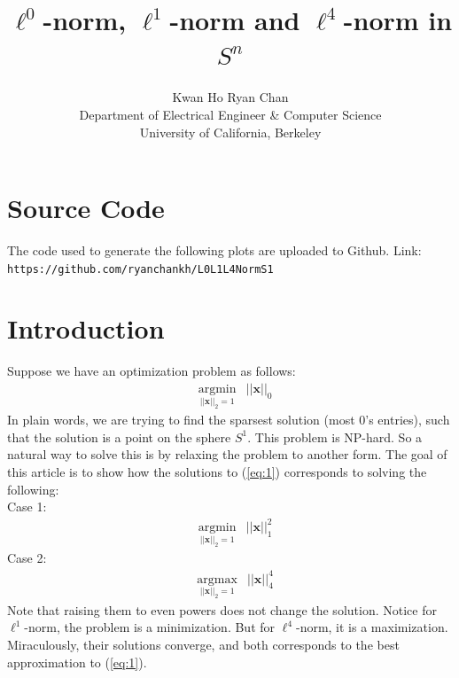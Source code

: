 \documentclass[11pt]{article}
\begin{document}
\title{$\ell^0$-norm, $\ell^1$-norm and $\ell^4$-norm in $S^n$}
\author{Kwan Ho Ryan Chan\\Department of Electrical Engineer \& Computer Science\\University of California, Berkeley}
\maketitle

\section{Source Code}
	The code used to generate the following plots are uploaded to Github. Link: \texttt{https://github.com/ryanchankh/L0L1L4NormS1}
\section{Introduction}
Suppose we have an optimization problem as follows:
\begin{equation}
\begin{aligned}
     & \underset{||\bm{x}||_2=1}{\text{argmin}} & ||\bm{x}||_0  \label{eq:1}
\end{aligned}
\end{equation}
In plain words, we are trying to find the sparsest solution (most 0's entries), such that the solution
is a point on the sphere $S^1$. This problem is NP-hard. So a natural way to solve this is by relaxing the problem to another form. The goal of this article is to show how the solutions to (\ref{eq:1}) corresponds to solving the following: \\
Case 1:
\begin{equation}
\begin{aligned}
     & \underset{||\bm{x}||_2=1}{\text{argmin}} & ||\bm{x}||_1^2  \label{eq:2}
\end{aligned}
\end{equation}
Case 2:  
\begin{equation}
\begin{aligned}
     & \underset{||\bm{x}||_2=1}{\text{argmax}} & ||\bm{x}||_4^4  \label{eq:3}
\end{aligned}
\end{equation}
Note that raising them to even powers does not change the solution. Notice for $\ell^1$-norm, the problem is a minimization. But for $\ell^4$-norm, it is a maximization. Miraculously, their solutions converge, and both corresponds to the best approximation to (\ref{eq:1}).  
\end{document}

